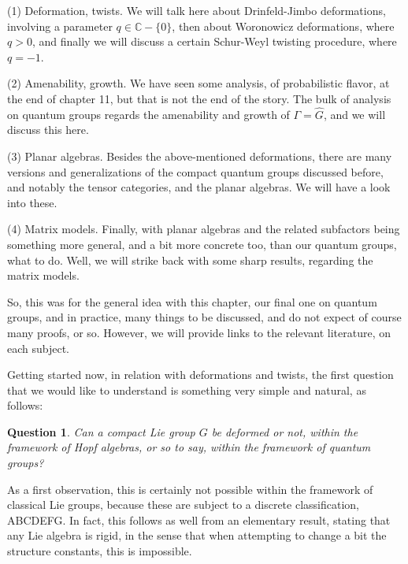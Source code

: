 \documentclass[12pt]{amsbook}
\newtheorem{question}[theorem]{Question}
\begin{document}
(1) Deformation, twists. We will talk here about Drinfeld-Jimbo deformations, involving a parameter $q\in\mathbb C-\{0\}$, then about Woronowicz deformations, where $q>0$, and finally we will discuss a certain Schur-Weyl twisting procedure, where $q=-1$.

\bigskip

(2) Amenability, growth. We have seen some analysis, of probabilistic flavor, at the end of chapter 11, but that is not the end of the story. The bulk of analysis on quantum groups regards the amenability and growth of $\Gamma=\widehat{G}$, and we will discuss this here.

\bigskip

(3) Planar algebras. Besides the above-mentioned deformations, there are many versions and generalizations of the compact quantum groups discussed before, and notably the tensor categories, and the planar algebras. We will have a look into these.

\bigskip

(4) Matrix models. Finally, with planar algebras and the related subfactors being something more general, and a bit more concrete too, than our quantum groups, what to do. Well, we will strike back with some sharp results, regarding the matrix models.

\bigskip

So, this was for the general idea with this chapter, our final one on quantum groups, and in practice, many things to be discussed, and do not expect of course many proofs, or so. However, we will provide links to the relevant literature, on each subject.

\bigskip

Getting started now, in relation with deformations and twists, the first question that we would like to understand is something very simple and natural, as follows:

\begin{question}
Can a compact Lie group $G$ be deformed or not, within the framework of Hopf algebras, or so to say, within the framework of quantum groups?
\end{question}

As a first observation, this is certainly not possible within the framework of classical Lie groups, because these are subject to a discrete classification, ABCDEFG. In fact, this follows as well from an elementary result, stating that any Lie algebra is rigid, in the sense that when attempting to change a bit the structure constants, this is impossible.
\end{document}
